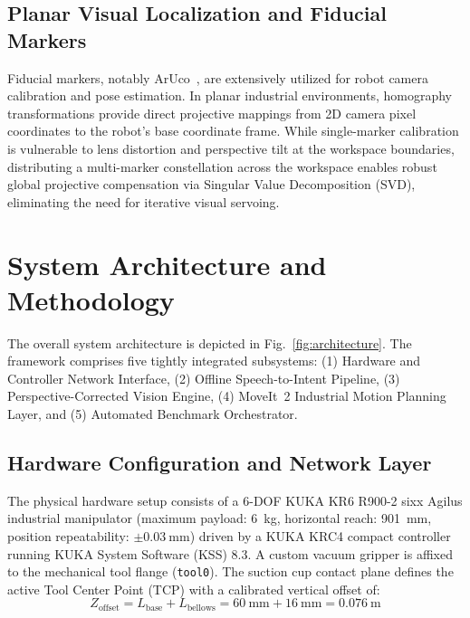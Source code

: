 \documentclass[runningheads]{llncs}
\begin{document}
\subsection{Planar Visual Localization and Fiducial Markers}
Fiducial markers, notably ArUco~\cite{aruco2014}, are extensively utilized for robot camera calibration and pose estimation. In planar industrial environments, homography transformations provide direct projective mappings from 2D camera pixel coordinates to the robot's base coordinate frame. While single-marker calibration is vulnerable to lens distortion and perspective tilt at the workspace boundaries, distributing a multi-marker constellation across the workspace enables robust global projective compensation via Singular Value Decomposition (SVD), eliminating the need for iterative visual servoing.

\section{System Architecture and Methodology}
\label{sec:methodology}

The overall system architecture is depicted in Fig.~\ref{fig:architecture}. The framework comprises five tightly integrated subsystems: (1) Hardware and Controller Network Interface, (2) Offline Speech-to-Intent Pipeline, (3) Perspective-Corrected Vision Engine, (4) MoveIt~2 Industrial Motion Planning Layer, and (5) Automated Benchmark Orchestrator.

\subsection{Hardware Configuration and Network Layer}
The physical hardware setup consists of a 6-DOF KUKA KR6 R900-2 sixx Agilus industrial manipulator (maximum payload: \SI{6}{\kilogram}, horizontal reach: \SI{901}{\milli\meter}, position repeatability: $\pm\SI{0.03}{\milli\meter}$) driven by a KUKA KRC4 compact controller running KUKA System Software (KSS) 8.3. A custom vacuum gripper is affixed to the mechanical tool flange (\texttt{tool0}). The suction cup contact plane defines the active Tool Center Point (TCP) with a calibrated vertical offset of:
\begin{equation}
    Z_{\text{offset}} = L_{\text{base}} + L_{\text{bellows}} = \SI{60}{\milli\meter} + \SI{16}{\milli\meter} = \SI{0.076}{\meter}
\end{equation}
\end{document}
